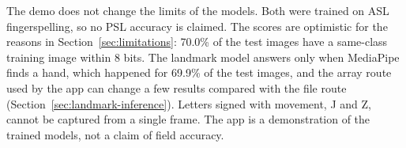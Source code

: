 The demo does not change the limits of the models. Both were trained on ASL fingerspelling, so no PSL accuracy is claimed. The scores are optimistic for the reasons in Section~\ref{sec:limitations}: 70.0\% of the test images have a same-class training image within 8 bits. The landmark model answers only when MediaPipe finds a hand, which happened for 69.9\% of the test images, and the array route used by the app can change a few results compared with the file route (Section~\ref{sec:landmark-inference}). Letters signed with movement, J and Z, cannot be captured from a single frame. The app is a demonstration of the trained models, not a claim of field accuracy.
